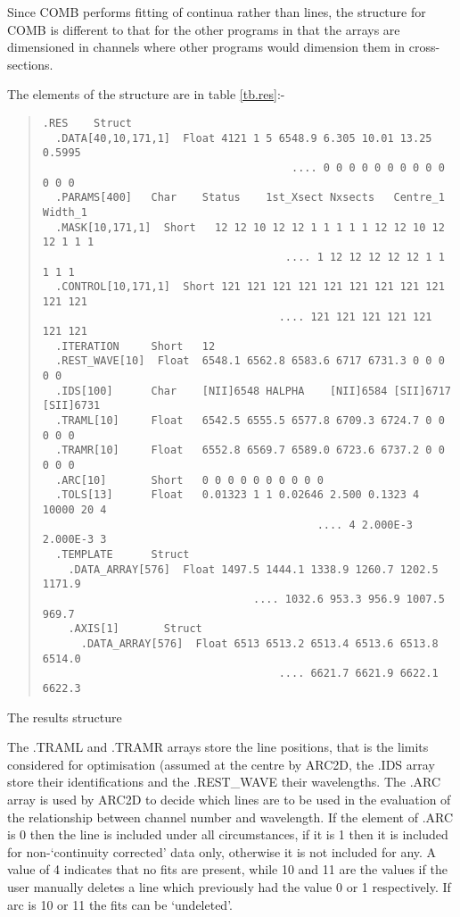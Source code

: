 Since COMB performs fitting of continua rather than lines, the structure
for COMB is different to that for the other programs in that the arrays
are dimensioned in channels where other programs would dimension them in
cross-sections.

 The elements of the structure are in table \ref{tb.res}:-
\begin{table}
\begin{quote}\begin{verbatim}
.RES    Struct
  .DATA[40,10,171,1]  Float 4121 1 5 6548.9 6.305 10.01 13.25 0.5995
                                       .... 0 0 0 0 0 0 0 0 0 0 0 0 0
  .PARAMS[400]   Char    Status    1st_Xsect Nxsects   Centre_1  Width_1
  .MASK[10,171,1]  Short   12 12 10 12 12 1 1 1 1 1 12 12 10 12 12 1 1 1
                                      .... 1 12 12 12 12 12 1 1 1 1 1
  .CONTROL[10,171,1]  Short 121 121 121 121 121 121 121 121 121 121 121
                                     .... 121 121 121 121 121 121 121
  .ITERATION     Short   12
  .REST_WAVE[10]  Float  6548.1 6562.8 6583.6 6717 6731.3 0 0 0 0 0
  .IDS[100]      Char    [NII]6548 HALPHA    [NII]6584 [SII]6717 [SII]6731
  .TRAML[10]     Float   6542.5 6555.5 6577.8 6709.3 6724.7 0 0 0 0 0
  .TRAMR[10]     Float   6552.8 6569.7 6589.0 6723.6 6737.2 0 0 0 0 0
  .ARC[10]       Short   0 0 0 0 0 0 0 0 0 0
  .TOLS[13]      Float   0.01323 1 1 0.02646 2.500 0.1323 4 10000 20 4
                                           .... 4 2.000E-3 2.000E-3 3
  .TEMPLATE      Struct
    .DATA_ARRAY[576]  Float 1497.5 1444.1 1338.9 1260.7 1202.5 1171.9
                                 .... 1032.6 953.3 956.9 1007.5 969.7
    .AXIS[1]       Struct
      .DATA_ARRAY[576]  Float 6513 6513.2 6513.4 6513.6 6513.8 6514.0
                                     .... 6621.7 6621.9 6622.1 6622.3
 \end{verbatim}\end{quote}
\caption[a]{The results structure}
\label{tb.res}
\end{table}
 The .TRAML and .TRAMR arrays store the line positions, that is
the limits considered for optimisation (assumed at
the centre by ARC2D, the .IDS array store their identifications and
the .REST\_WAVE their wavelengths. The .ARC array is used by ARC2D to
decide which lines are to be used in the evaluation of the relationship
between channel number and wavelength. If the element of .ARC
is 0 then the line is included under all circumstances, if it is 1 then
it is included for non-`continuity corrected' data only, otherwise it is
not included for any. A value of 4 indicates that no fits are present,
while 10 and 11 are the values if the user manually deletes a line which
previously had the value 0 or 1 respectively. If arc is 10 or 11 the fits
can be `undeleted'.

